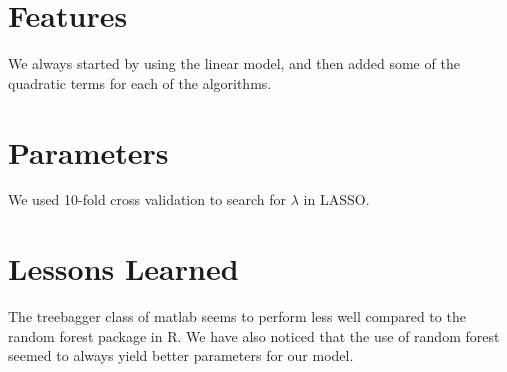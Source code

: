 \documentclass[a4paper, 11pt]{article}
\begin{document}
\section{Features}
We always started by using the linear model, and then added some of the quadratic terms for each of the algorithms.

\section{Parameters}
We used 10-fold cross validation to search for $\lambda$ in LASSO.

\section{Lessons Learned} The treebagger class of matlab seems to perform less well compared to the random forest package in R. We have also noticed that the use of random forest seemed to always yield better parameters for our model.
\end{document}
